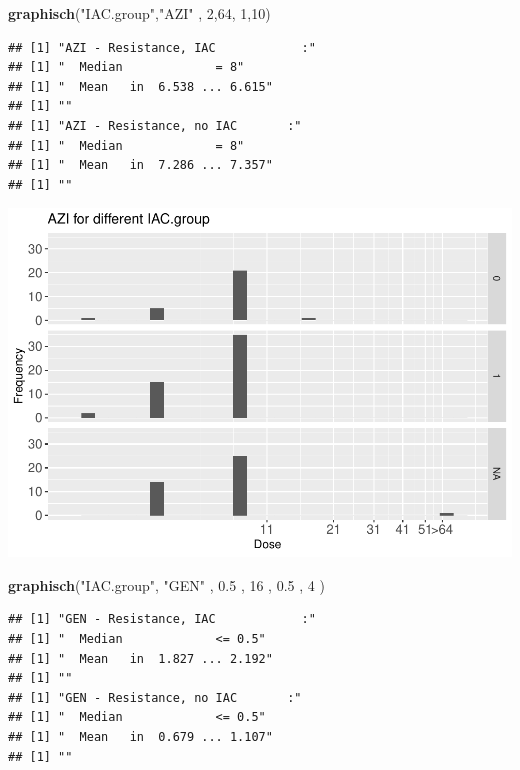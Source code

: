 \documentclass[
]{article}
\newenvironment{Shaded}{\begin{snugshade}}{\end{snugshade}}
\newcommand{\DecValTok}[1]{\textcolor[rgb]{0.00,0.00,0.81}{#1}}
\newcommand{\FloatTok}[1]{\textcolor[rgb]{0.00,0.00,0.81}{#1}}
\newcommand{\KeywordTok}[1]{\textcolor[rgb]{0.13,0.29,0.53}{\textbf{#1}}}
\newcommand{\NormalTok}[1]{#1}
\newcommand{\StringTok}[1]{\textcolor[rgb]{0.31,0.60,0.02}{#1}}
\begin{document}
\begin{Shaded}
\begin{Highlighting}[]
   \KeywordTok{graphisch}\NormalTok{(}\StringTok{"IAC.group"}\NormalTok{,}\StringTok{"AZI"}\NormalTok{ , }\DecValTok{2}\NormalTok{,}\DecValTok{64}\NormalTok{,   }\DecValTok{1}\NormalTok{,}\DecValTok{10}\NormalTok{)}
\end{Highlighting}
\end{Shaded}

\begin{verbatim}
## [1] "AZI - Resistance, IAC            :"
## [1] "  Median             = 8"
## [1] "  Mean   in  6.538 ... 6.615"
## [1] ""
## [1] "AZI - Resistance, no IAC       :"
## [1] "  Median             = 8"
## [1] "  Mean   in  7.286 ... 7.357"
## [1] ""
\end{verbatim}

\includegraphics{Verteilungen_files/figure-latex/unnamed-chunk-8-1.pdf}

\begin{Shaded}
\begin{Highlighting}[]
   \KeywordTok{graphisch}\NormalTok{(}\StringTok{"IAC.group"}\NormalTok{, }\StringTok{"GEN"}\NormalTok{ , }\FloatTok{0.5}\NormalTok{  ,  }\DecValTok{16}\NormalTok{   ,   }\FloatTok{0.5}\NormalTok{  ,   }\DecValTok{4}\NormalTok{    )}
\end{Highlighting}
\end{Shaded}

\begin{verbatim}
## [1] "GEN - Resistance, IAC            :"
## [1] "  Median             <= 0.5"
## [1] "  Mean   in  1.827 ... 2.192"
## [1] ""
## [1] "GEN - Resistance, no IAC       :"
## [1] "  Median             <= 0.5"
## [1] "  Mean   in  0.679 ... 1.107"
## [1] ""
\end{verbatim}
\end{document}
